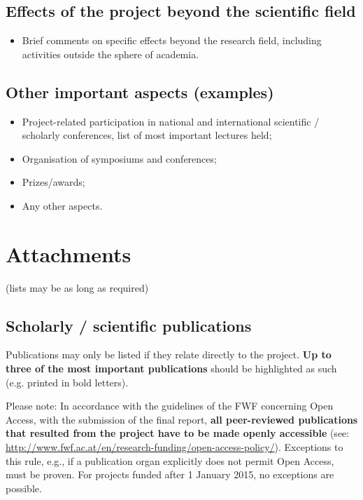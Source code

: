 \documentclass[a4paper, 11pt]{article}
\begin{document}
\subsection{Effects of the project beyond the scientific field}

\begin{itemize}
\item Brief comments on specific effects beyond the research field, including
activities outside the sphere of academia. 
\end{itemize}

\subsection{Other important aspects (examples)}

\begin{itemize}
\item Project-related participation in national and international scientific /
scholarly conferences, list of most important lectures held;
\item Organisation of symposiums and conferences; 
\item Prizes/awards;
\item Any other aspects.
\end{itemize}

\newpage
\section{Attachments}
\setcounter{subsection}{0}

(lists may be as long as required)

\subsection{Scholarly / scientific publications}

Publications may only be listed if they relate directly to the project. \textbf{Up to
three of the most important publications} should be highlighted as such (e.g.
printed in bold letters).

Please note: In accordance with the guidelines of the FWF concerning Open Access, with 
the submission of the final report, \textbf{all peer-reviewed publications that resulted from
the project have to be made openly accessible}
(see: \url{http://www.fwf.ac.at/en/research-funding/open-access-policy/}).
Exceptions to this rule, e.g., if a publication organ explicitly does not permit 
Open Access, must be proven. For projects funded after 1 January 2015, no 
exceptions are possible.
\end{document}
